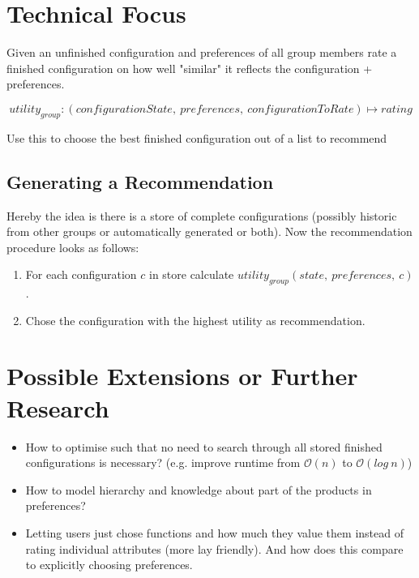 \documentclass{article}
\begin{document}
\FloatBarrier

\FloatBarrier

\section{Technical Focus}

Given an unfinished configuration and preferences of all group members rate a finished configuration on how well "similar" it reflects the configuration + preferences.

$$utility_{group} : (configurationState,\ preferences,\ configurationToRate) \mapsto rating$$

Use this to choose the best finished configuration out of a list to recommend

\subsection{Generating a Recommendation}

Hereby the idea is there is a store of complete configurations (possibly historic from other groups or automatically generated or both).
Now the recommendation procedure looks as follows:

\begin{enumerate}
    \item For each configuration $c$ in store calculate $utility_{group}(state,\ preferences, \ c)$.
    \item Chose the configuration with the highest utility as recommendation.
\end{enumerate}


\section{Possible Extensions or Further Research}

\begin{itemize}
    \item How to optimise such that no need to search through all stored finished configurations is necessary? (e.g. improve runtime from $\mathcal{O}(n)$ to $\mathcal{O}(log\ n)$)
    \item How to model hierarchy and knowledge about part of the products in preferences?
    \item Letting users just chose functions and how much they value them instead of rating individual attributes (more lay friendly). And how does this compare to explicitly choosing preferences.
\end{itemize}
    
\end{document}
